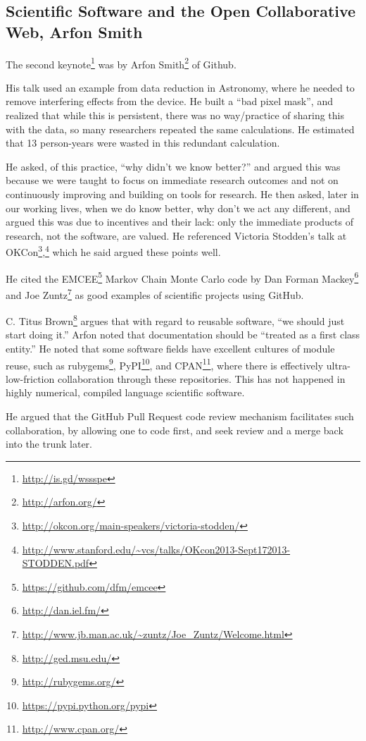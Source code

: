 \documentclass[11pt, oneside]{amsart}
\begin{document}
\subsection{Scientific Software and the Open Collaborative Web, Arfon Smith}


The second keynote\footnote{\url{http://is.gd/wssspe}} was by
 Arfon Smith\footnote{\url{http://arfon.org/}} of Github.

His talk used an example from data reduction in Astronomy, where he
needed to remove interfering effects from the device. He built a
``bad pixel mask'', and realized that while this is persistent, there
was no way/practice of sharing this with the data, so many researchers
repeated the same calculations. He estimated that 13 person-years were wasted in
this redundant calculation.

He asked, of this practice, ``why didn't we know better?'' and argued
this was because we were taught to focus on immediate research outcomes
and not on continuously improving and building on tools for research. He
then asked, later in our working lives, when we do know better, why
don't we act any different, and argued this was due to incentives and their lack:
only the immediate products of research, not the software, are valued.
He referenced Victoria Stodden's talk at OKCon\footnote{\url{http://okcon.org/main-speakers/victoria-stodden/}},\footnote{\url{http://www.stanford.edu/~vcs/talks/OKcon2013-Sept172013-STODDEN.pdf}}
which he said argued these points well.

He cited the EMCEE\footnote{\url{https://github.com/dfm/emcee}} Markov Chain
Monte Carlo code by Dan Forman Mackey\footnote{\url{http://dan.iel.fm/}} and Joe Zuntz\footnote{\url{http://www.jb.man.ac.uk/~zuntz/Joe_Zuntz/Welcome.html}} as 
good examples of  scientific projects using GitHub.  

C. Titus Brown\footnote{\url{http://ged.msu.edu/}} argues that with regard to
reusable software, ``we should just start doing it.'' Arfon noted that
documentation should be ``treated as a first class entity.''
He noted that some software fields have excellent cultures of module
reuse, such as rubygems\footnote{\url{http://rubygems.org/}},
PyPI\footnote{\url{https://pypi.python.org/pypi}}, and CPAN\footnote{\url{http://www.cpan.org/}}, where there is effectively
ultra-low-friction collaboration through these repositories. This has
not happened in highly numerical, compiled language scientific software.

He argued that the GitHub Pull Request code review mechanism facilitates
such collaboration, by allowing one to code first, and seek review and a
merge back into the trunk later.
\end{document}
